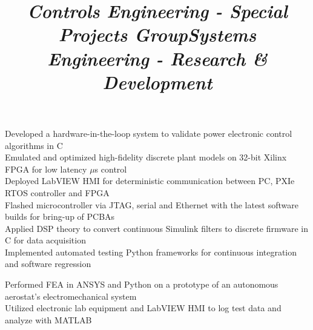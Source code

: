 \documentclass[mm]{res}
\begin{document}
\begin{resume}
\title{\textsl{Controls Engineering - Special Projects Group}}
\begin{position}
\tb Developed a hardware-in-the-loop system to validate power electronic control algorithms in C\\
\tb Emulated and optimized high-fidelity discrete plant models on 32-bit Xilinx FPGA for low latency $\mu$s control \\
\tb Deployed LabVIEW HMI for deterministic communication between PC, PXIe RTOS controller and FPGA \\
\tb Flashed microcontroller via JTAG, serial and Ethernet with the latest software builds for bring-up of PCBAs \\
\tb Applied DSP theory to convert continuous Simulink filters to discrete firmware in C for data acquisition\\
\tb Implemented automated testing Python frameworks for continuous integration and software regression
\end{position}

\title{\textsl{Systems Engineering - Research \& Development}}
\begin{position}
\tb Performed FEA in ANSYS and Python on a prototype of an autonomous aerostat's electromechanical system \\
\tb Utilized electronic lab equipment and LabVIEW HMI to log test data and analyze with MATLAB
\end{position}


\end{resume}
\end{document}
